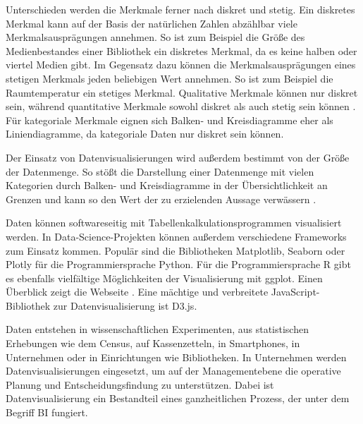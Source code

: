 Unterschieden werden die Merkmale ferner nach diskret und stetig.
Ein diskretes Merkmal kann auf der Basis der natürlichen Zahlen abzählbar viele Merkmalsausprägungen annehmen.
So ist zum Beispiel die Größe des Medienbestandes einer Bibliothek ein diskretes Merkmal, da es keine halben oder viertel Medien gibt.
Im Gegensatz dazu können die Merkmalsausprägungen eines stetigen Merkmals jeden beliebigen Wert annehmen. So ist zum Beispiel die Raumtemperatur ein stetiges Merkmal.
Qualitative Merkmale können nur diskret sein, während quantitative Merkmale sowohl diskret als auch stetig sein können \cite[vgl.][102 f.]{kirk_data_2019}. 
Für kategoriale Merkmale eignen sich Balken- und Kreisdiagramme eher als Liniendiagramme, da kategoriale Daten nur diskret sein können.

Der Einsatz von Datenvisualisierungen wird außerdem bestimmt von der Größe der Datenmenge.
So stößt die Darstellung einer Datenmenge mit vielen Kategorien durch Balken- und Kreisdiagramme 
in der Übersichtlichkeit an Grenzen und kann so den Wert der zu erzielenden Aussage verwässern \cite[vgl.][5 ff.]{few_show_2012}. 

Daten können softwareseitig mit Tabellenkalkulationsprogrammen visualisiert werden.
In Data-Science-Projekten können außerdem verschiedene Frameworks zum Einsatz kommen. Populär sind die Bibliotheken Matplotlib, Seaborn oder Plotly für 
die Programmiersprache Python. Für die Programmiersprache R gibt es ebenfalls vielfältige Möglichkeiten der Visualisierung mit
ggplot. Einen Überblick zeigt die Webseite  \cite{witherley_chartmaker_2020}.
Eine mächtige und verbreitete JavaScript-Bibliothek zur Datenvisualisierung ist D3.js.


Daten entstehen in wissenschaftlichen Experimenten, aus statistischen Erhebungen wie 
dem Census, auf Kassenzetteln, in Smartphones, in Unternehmen oder in Einrichtungen wie Bibliotheken. 
In Unternehmen werden Datenvisualisierungen eingesetzt, um auf der Managementebene die operative Planung und Entscheidungsfindung zu unterstützen.
Dabei ist Datenvisualisierung ein Bestandteil eines ganzheitlichen Prozess, der unter dem Begriff \acrfull{BI} fungiert. 


